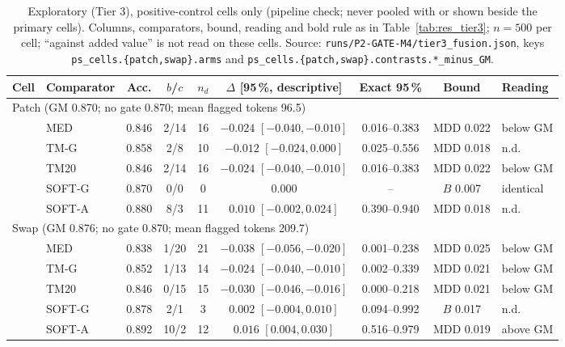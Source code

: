 \begin{table}[!tbp]
\centering
\caption{Exploratory (Tier 3), positive-control cells only (pipeline check; never pooled with or shown beside the primary cells).
Columns, comparators, bound, reading and bold rule as in Table~\ref{tab:res_tier3}; $n=500$ per cell; ``against added value'' is not
read on these cells. Source: \nolinkurl{runs/P2-GATE-M4/tier3_fusion.json}, keys \nolinkurl{ps_cells.{patch,swap}.arms} and
\nolinkurl{ps_cells.{patch,swap}.contrasts.*_minus_GM}.}
\label{tab:res_tier3_ps}
\footnotesize
\begin{adjustbox}{max width=\textwidth}
\begin{tabular}{llccccccl}
\toprule
Cell & Comparator & Acc. & $b$/$c$ & $n_d$ & $\Delta$ [95\,\%, descriptive] & Exact 95\,\% & Bound & Reading \\
\midrule
\multicolumn{9}{l}{Patch \quad (GM 0.870; no gate 0.870; mean flagged tokens 96.5)} \\
& MED & 0.846 & 2/14 & 16 & $\mathbf{-0.024}$ $[-0.040,-0.010]$ & 0.016--0.383 & MDD 0.022 & below GM \\
& TM-G & 0.858 & 2/8 & 10 & $-0.012$ $[-0.024,0.000]$ & 0.025--0.556 & MDD 0.018 & n.d. \\
& TM20 & 0.846 & 2/14 & 16 & $\mathbf{-0.024}$ $[-0.040,-0.010]$ & 0.016--0.383 & MDD 0.022 & below GM \\
& SOFT-G & 0.870 & 0/0 & 0 & $0.000$ & -- & $B$ 0.007 & identical \\
& SOFT-A & 0.880 & 8/3 & 11 & $0.010$ $[-0.002,0.024]$ & 0.390--0.940 & MDD 0.018 & n.d. \\
\midrule
\multicolumn{9}{l}{Swap \quad (GM 0.876; no gate 0.870; mean flagged tokens 209.7)} \\
& MED & 0.838 & 1/20 & 21 & $\mathbf{-0.038}$ $[-0.056,-0.020]$ & 0.001--0.238 & MDD 0.025 & below GM \\
& TM-G & 0.852 & 1/13 & 14 & $\mathbf{-0.024}$ $[-0.040,-0.010]$ & 0.002--0.339 & MDD 0.021 & below GM \\
& TM20 & 0.846 & 0/15 & 15 & $\mathbf{-0.030}$ $[-0.046,-0.016]$ & 0.000--0.218 & MDD 0.021 & below GM \\
& SOFT-G & 0.878 & 2/1 & 3 & $0.002$ $[-0.004,0.010]$ & 0.094--0.992 & $B$ 0.017 & n.d. \\
& SOFT-A & 0.892 & 10/2 & 12 & $\mathbf{0.016}$ $[0.004,0.030]$ & 0.516--0.979 & MDD 0.019 & above GM \\
\bottomrule
\end{tabular}
\end{adjustbox}
\end{table}

